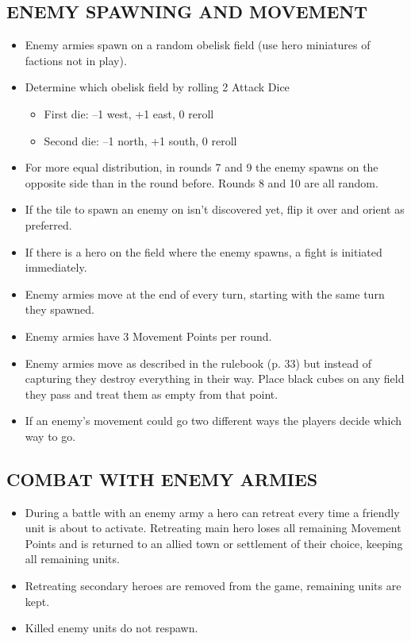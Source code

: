 \newpage

\subsection*{\MakeUppercase{Enemy spawning and movement}}

\begin{itemize}
    \item Enemy armies spawn on a random obelisk field (use hero miniatures of factions not in play).
    \item Determine which obelisk field by rolling 2 Attack Dice
    \begin{itemize}
        \item First die: --1 west, +1 east, 0 reroll
        \item Second die: --1 north, +1 south, 0 reroll
    \end{itemize}
    \item For more equal distribution, in rounds 7 and 9 the enemy spawns on the opposite side
    than in the round before. Rounds 8 and 10 are all random.
    \item If the tile to spawn an enemy on isn't discovered yet, flip it over and orient as preferred.
    \item If there is a hero on the field where the enemy spawns, a fight is initiated immediately.
    \item Enemy armies move at the end of every turn, starting with the same turn they spawned.
    \item Enemy armies have 3 Movement Points per round.
    \item Enemy armies move as described in the rulebook (p. 33) but instead of capturing they destroy
    everything in their way. Place black cubes on any field they pass and treat them as empty from that point.
    \item If an enemy's movement could go two different ways the players decide which way to go.
\end{itemize}

\subsection*{\MakeUppercase{Combat with enemy armies}}

\begin{itemize}
    \item During a battle with an enemy army a hero can retreat every time a friendly unit is about to 
    activate. Retreating main hero loses all remaining Movement Points and is returned to an
    allied town or settlement of their choice, keeping all remaining units.
    \item Retreating secondary heroes are removed from the game, remaining units are kept. 
    \item Killed enemy units do not respawn. 
\end{itemize}

